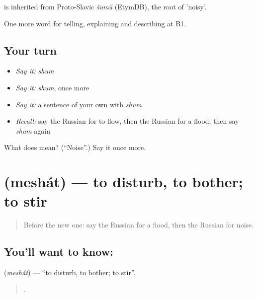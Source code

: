 \begin{cousinweb}
\emph{} is inherited from Proto-Slavic \emph{šumŭ} (EtymDB), the root of \emph{} 'noisy'.
\end{cousinweb}

\begin{grammarlens}[title={What you've built}]
One more word for telling, explaining and describing at B1.
\end{grammarlens}

\subsection*{Your turn}
\begin{itemize}
\raggedright
  \item \emph{Say it:} \emph{shum}
  \item \emph{Say it:} \emph{shum}, once more
  \item \emph{Say it:} a sentence of your own with \emph{shum}
  \item \emph{Recall:} say the Russian for to flow, then the Russian for a flood, then say \emph{shum} again
\end{itemize}

\begin{tcolorbox}[breakable,colback=teal!4,colframe=teal!35!black,title={Before you move on}]
What does  mean? (\textquotedblleft{}Noise\textquotedblright{}.) Say it once more.
\end{tcolorbox}
\section[\texorpdfstring{\ru{мешать} (meshát)}{мешать (meshát)}]{ (meshát) — to disturb, to bother; to stir}

\label{lesson:RU-C433-meshat}



\begin{quote}
Before the new one: say the Russian for a flood, then the Russian for noise.
\end{quote}

\subsection*{You'll want to know: }
\textbf{} (\emph{meshát}) — \textquotedblleft{}to disturb, to bother; to stir\textquotedblright{}.

\begin{quote}
    .
\end{quote}

